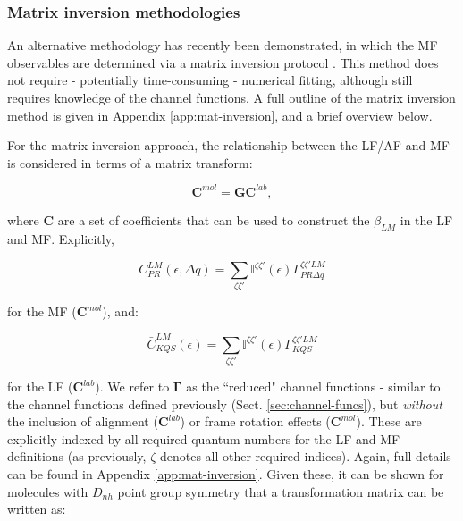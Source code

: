 \documentclass[10pt]{article}
\begin{document}
\subsubsection{Matrix inversion methodologies\label{sec:matrix-inv-intro}}

An alternative methodology has recently been demonstrated, in which the MF observables are determined via a matrix inversion protocol \cite{gregory2021MolecularFramePhotoelectron}. This method does not require - potentially time-consuming - numerical fitting, although still requires knowledge of the channel functions. A full outline of the matrix inversion method is given in Appendix \ref{app:mat-inversion}, and a brief overview below.

For the matrix-inversion approach, the relationship between the LF/AF and MF is considered in terms of a matrix transform:

\begin{equation}
\mathbf{C}^{mol}=\mathbf{G}\mathbf{C}^{lab},\label{eq:basic}
\end{equation}

where $\mathbf{C}$ are a set of coefficients that can be used to construct the $\beta_{LM}$ in the LF and MF. Explicitly, 


\begin{equation}
C_{PR}^{LM}(\epsilon,\Delta q)=\sum_{\zeta\zeta'}\mathbb{I}^{\zeta\zeta'}(\epsilon)\Gamma_{PR\Delta q}^{\zeta\zeta'LM}
\end{equation}

for the MF ($\mathbf{C}^{mol}$), and:

\begin{equation}
\bar{C}_{KQS}^{LM}(\epsilon)=\sum_{\zeta\zeta'}\mathbb{I}^{\zeta\zeta'}(\epsilon)\Gamma_{KQS}^{\zeta\zeta'LM}
\label{eq:C-AF}
\end{equation}

for the LF ($\mathbf{C}^{lab}$). We refer to $\mathbf{\Gamma}$ as the ``reduced" channel functions - similar to the channel functions defined previously (Sect. \ref{sec:channel-funcs}), but \textit{without} the inclusion of alignment ($\mathbf{C}^{lab}$) or frame rotation effects ($\mathbf{C}^{mol}$). These are explicitly indexed by all required quantum numbers for the LF and MF definitions (as previously, $\zeta$ denotes all other required indices). Again, full details can be found in Appendix \ref{app:mat-inversion}. Given these, it can be shown for molecules with $D_{nh}$ point group symmetry that a transformation matrix can be written as:
\end{document}
